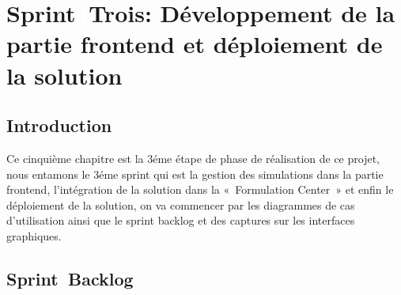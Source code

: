 \graphicspath{{./chapitres/chapitre5/figures/}}
\setcounter{mtc}{5}
\chapter{Sprint\textcolor{white}{J}Trois: Développement de la partie frontend et déploiement de la solution }

\minitoc
\newpage
\section*{Introduction}
Ce cinquième chapitre est la 3éme étape de phase de réalisation de ce projet, nous entamons le 3éme sprint qui est la gestion des simulations dans la partie frontend, l’intégration de la solution dans la « Formulation Center » et enfin le déploiement de la solution, on va commencer par les diagrammes de cas d’utilisation ainsi que le sprint backlog et des captures sur les interfaces graphiques.


\section{Sprint\textcolor{white}{J}Backlog}
